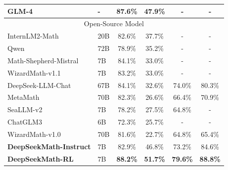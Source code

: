 \begin{table}[t!]
{\begin{tabular}{llcccc}
GLM-4 &           -            & 87.6\%                         & 47.9\%               &            -          &       -                                                          \\
\midrule
\multicolumn{6}{c}{Open-Source Model}                                                                                                                                           \\ 
\midrule
InternLM2-Math & 20B           & 82.6\%                         & 37.7\%          &           -      &             -                                                     \\
Qwen & 72B                     & 78.9\%                         & 35.2\%          &          -       &       -                                                         \\
Math-Shepherd-Mistral & 7B & 84.1\%                         & 33.0\%          &             -    &               -                                                     \\
WizardMath-v1.1 & 7B           & 83.2\%                         & 33.0\%          &            -     &               -                                                  \\
DeepSeek-LLM-Chat & 67B        & 84.1\%                         & 32.6\%               & 74.0\%               & 80.3\%                                                            \\
MetaMath & 70B                 & 82.3\%                         & 26.6\%          & 66.4\%          & 70.9\%                                                             \\
SeaLLM-v2 & 7B & 78.2\% & 27.5\% & 64.8\% & - \\
ChatGLM3 & 6B                  & 72.3\%                         & 25.7\%          &         -        &          -                                                      \\
WizardMath-v1.0 & 70B          & 81.6\%                         & 22.7\%          & 64.8\%          & 65.4\%                                                            \\ 
\midrule
\textbf{DeepSeekMath-Instruct} & 7B     & 82.9\%                         & 46.8\%          & 73.2\%          & 84.6\%                                                     \\
\textbf{DeepSeekMath-RL} & 7B           & \textbf{88.2\%}                & \textbf{51.7\%} & \textbf{79.6\%} & \textbf{88.8\%}                                        \\

\end{tabular}}
\end{table}
